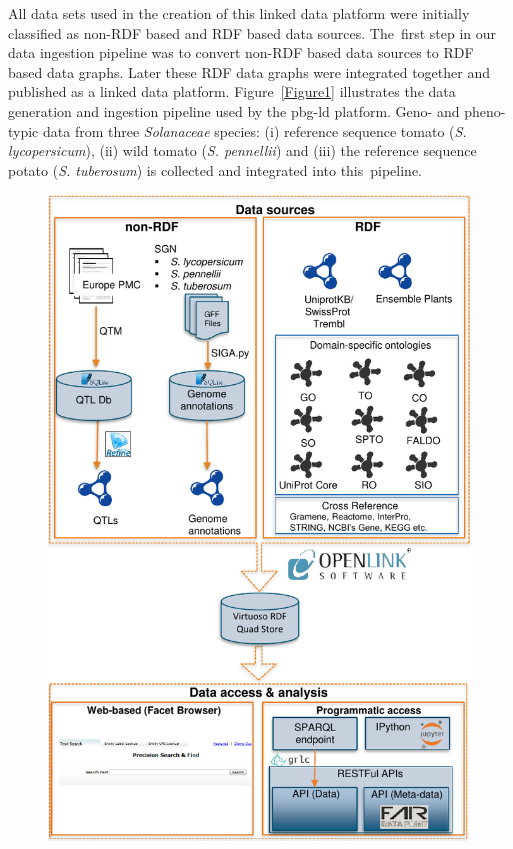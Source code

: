 \documentclass[applsci,article,accept,moreauthors,pdftex]{Definitions/mdpi}
\begin{document}
{{{All data sets used in the creation of this linked data platform were initially classified as non-RDF based and RDF based data sources. The~first step in our data ingestion pipeline was to convert non-RDF based data sources to RDF based data graphs. Later these RDF data graphs were integrated together and published as a linked data platform.}} Figure~\ref{Figure1} illustrates the data generation and ingestion pipeline used by the pbg-ld platform. Geno- and pheno-typic data from three \textit{Solanaceae}%
	 species:%
	 (i) reference sequence tomato (\textit{S. lycopersicum}), (ii) wild tomato (\textit{S. pennellii}) and (iii) the reference sequence potato  (\textit{S. tuberosum}) is collected and integrated into this~pipeline. 

\begin{figure}[H]
\centering
\includegraphics[scale=.95]{Figure1.pdf}

\end{figure}}
\end{document}

